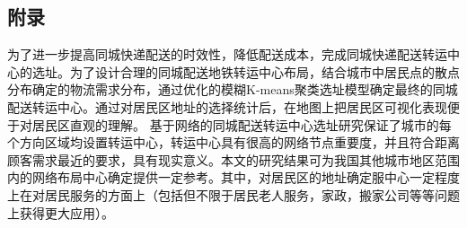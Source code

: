 \clearpage
\begin{appendices}
\section{附录}

为了进一步提高同城快递配送的时效性，降低配送成本，完成同城快递配送转运中心的选址。为了设计合理的同城配送地铁转运中心布局，结合城市中居民点的散点分布确定的物流需求分布，通过优化的模糊K-means聚类选址模型确定最终的同城配送转运中心。通过对居民区地址的选择统计后，在地图上把居民区可视化表现便于对居民区直观的理解。
基于网络的同城配送转运中心选址研究保证了城市的每个方向区域均设置转运中心，转运中心具有很高的网络节点重要度，并且符合距离顾客需求最近的要求，具有现实意义。本文的研究结果可为我国其他城市地区范围内的网络布局中心确定提供一定参考。其中，对居民区的地址确定服中心一定程度上在对居民服务的方面上（包括但不限于居民老人服务，家政，搬家公司等等问题上获得更大应用）。







\end{appendices}